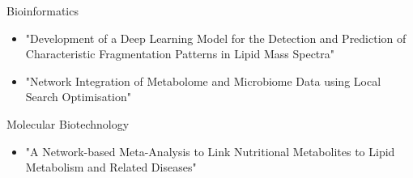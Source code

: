 \datedsubsection{}
{%
}
{%
	Bioinformatics
}
{%
	\begin{itemize}
		\item "Development of a Deep Learning Model for the Detection and Prediction of Characteristic Fragmentation Patterns in Lipid Mass Spectra"
		\item "Network Integration of Metabolome and Microbiome Data using Local Search Optimisation"
	\end{itemize}
}

\datedsubsection{}
{%
}
{%
	Molecular Biotechnology
}
{%
	\begin{itemize}
		\item "A Network-based Meta-Analysis to Link Nutritional Metabolites to Lipid Metabolism and Related Diseases"
	\end{itemize}
}
